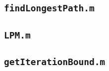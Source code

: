\documentclass[paper=a4, fontsize=11pt]{scrartcl} %
\begin{document}


\subsection*{\texttt{findLongestPath.m}} %



\subsection*{\texttt{LPM.m}} %



\subsection*{\texttt{getIterationBound.m}} %



\end{document}
